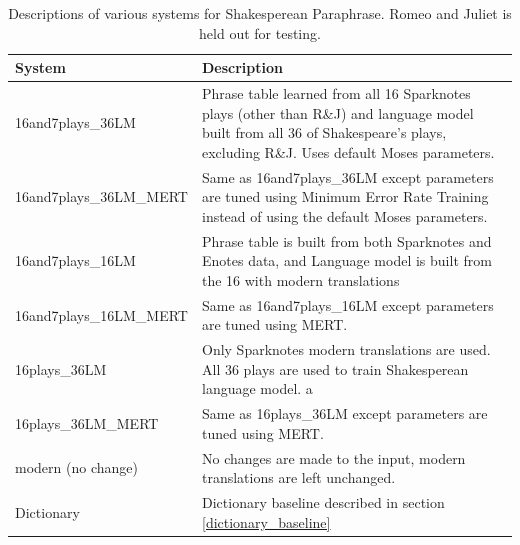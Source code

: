 \documentclass[10pt,a5paper,twoside]{article}
\begin{document}
\begin{table}
  \begin{center}
    \begin{tabular}{|l|p{3in}|}
      \hline
      System & Description \\
      \hline
      \hline
      16and7plays\_36LM & Phrase table learned from all 16 Sparknotes plays (other than R\&J) and language model built from all 36 of Shakespeare's plays, excluding R\&J.
      Uses default Moses parameters. \\
      \hline
      16and7plays\_36LM\_MERT & Same as 16and7plays\_36LM except parameters are tuned using Minimum Error Rate Training instead of using the default Moses parameters.\\
      \hline
      16and7plays\_16LM & Phrase table is built from both Sparknotes and Enotes data, and Language model is built from the 16 with modern translations\\
      \hline
      16and7plays\_16LM\_MERT & Same as 16and7plays\_16LM except parameters are tuned using MERT. \\
      \hline
      16plays\_36LM & Only Sparknotes modern translations are used.  All 36 plays are used to train Shakesperean language model. a\\
      \hline
      16plays\_36LM\_MERT & Same as 16plays\_36LM except parameters are tuned using MERT. \\
      \hline
      modern (no change) & No changes are made to the input, modern translations are left unchanged. \\
      \hline
      Dictionary & Dictionary baseline described in section \ref{dictionary_baseline}\\
      \hline
    \end{tabular}
  \end{center}
  \caption{Descriptions of various systems for Shakesperean Paraphrase.  Romeo and Juliet is held out for testing.}
  \label{systems}
\end{table}
\end{document}
